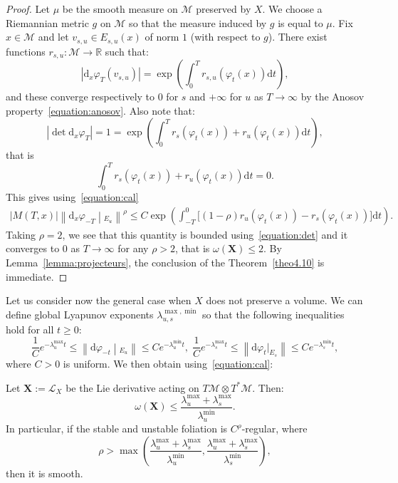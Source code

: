 \documentclass[AHL,Unicode,longabstracts,published]{cedram}
\newcommand{\R}{\mathbb{R}}
\newcommand{\X}{\mathbf{X}}
\newcommand{\mc}{\mathcal}
\newcommand{\M}{\mathcal{M}}
\newcommand{\dd}{\mathrm{d}}
\begin{document}
\begin{proof}
Let $\mu$ be the smooth measure on $\M$ preserved by $X$. We choose a Riemannian metric $g$ on $\M$ so that the measure induced by $g$ is equal to $\mu$. Fix $x \in \M$ and let $v_{s,u} \in E_{s,u}(x)$ of norm $1$ (with respect to $g$). There exist functions $r_{s,u} : \M \rightarrow \R$ such that:
\[
\left|\dd_x \varphi_T(v_{s,u})\right| = \exp \left(\int_0^T r_{s,u}(\varphi_t(x)) \dd t\right),
\]
and these converge respectively to $0$ for $s$ and $+\infty$ for $u$ as $T \rightarrow \infty$ by the Anosov property~\eqref{equation:anosov}. Also note that:
\[
\left|\det \dd_x \varphi_T\right| = 1 = \exp \left(\int_0^T r_{s}(\varphi_t(x)) + r_{u}(\varphi_t(x)) \dd t\right),
\]
that is
\begin{equation}\label{equation:det}
\int_0^T r_{s}(\varphi_t(x)) + r_{u}(\varphi_t(x)) \dd t = 0.
\end{equation}
This gives using~\eqref{equation:cal}
\begin{align*}
|M(T,x)| \left\|\dd_x \varphi_{-T}\middle|_{E_u}\right\|^\rho \leq C \exp\left(\int_{-T}^0 \big[(1-\rho) r_u(\varphi_t (x)) - r_s(\varphi_t(x))\big] \dd t\right).
\end{align*}
Taking $\rho = 2$, we see that this quantity is bounded using~\eqref{equation:det} and it converges to $0$ as $T \rightarrow \infty$ for any $\rho > 2$, that is $\omega(\X) \leq 2$. By Lemma~\ref{lemma:projecteurs}, the conclusion of the Theorem~\ref{theo4.10} is immediate.
\end{proof}


Let us consider now the general case when $X$ does not preserve a volume. We can define global Lyapunov exponents $\lambda^{\max,\min}_{u,s}$ so that the following inequalities hold for all $t \geq 0$:
\[
\frac{1}{C} e^{-\lambda^{\max}_u t} \leq \left\| \dd\varphi_{-t}\middle|_{E_u}\right\| \leq Ce^{-\lambda^{\min}_u t},\;\frac{1}{C} e^{-\lambda^{\max}_s t} \leq \left\| \dd\varphi_{t}|_{E_s}\right\| \leq Ce^{-\lambda^{\min}_s t},
\]
where $C > 0$ is uniform. We then obtain using~\eqref{equation:cal}:

\begin{theo}\label{theorem:rigidity-foliation}
Let $\X := \mc{L}_X$ be the Lie derivative acting on $T\M \otimes T^*\M$. Then:
\[
\omega(\X) \leq \dfrac{\lambda^{\max}_u + \lambda^{\max}_s}{\lambda^{\min}_u}.
\]
In particular, if the stable and unstable foliation is $C^\rho$-regular, where
\[
\rho > \max\left(\dfrac{\lambda^{\max}_u + \lambda^{\max}_s}{\lambda^{\min}_u}, \dfrac{\lambda^{\max}_u + \lambda^{\max}_s}{\lambda^{\min}_s} \right),
\]
then it is smooth.
\end{theo}
\end{document}
